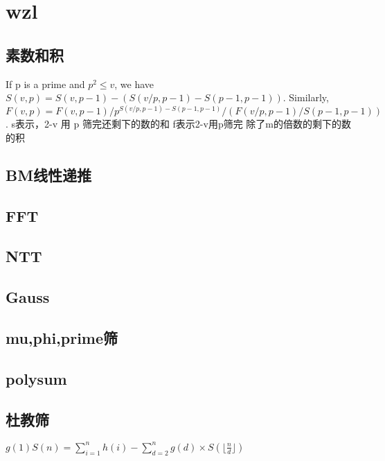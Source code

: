 \newpage
\section{wzl}
	\subsection{素数和积}
		\begin{flushleft}
			If p is a prime and $p^2 \leq v$, we have $S(v,p) = S(v,p-1) - (S(v/p,p-1) - S(p-1,p-1))$.
			\linebreak Similarly, $F(v,p) = F(v,p-1) / p^{S(v/p,p-1)-S(p-1,p-1)} / (F(v/p,p-1) / S(p-1,p-1))$.
			\linebreak s表示，2-v 用 p 筛完还剩下的数的和
			\linebreak f表示2-v用p筛完 除了m的倍数的剩下的数的积
		\end{flushleft}
		
	\subsection{BM线性递推}
		
	\subsection{FFT}
		
	\subsection{NTT}
		
	\subsection{Gauss}
		
	\subsection{mu,phi,prime筛}
		
	\subsection{polysum}
		
	\subsection{杜教筛}
		\begin{flushleft}
			$g(1)S(n) = \sum_{i = 1}^{n}h(i) - \sum_{d = 2}^{n}g(d) \times S(\lfloor\frac{n}{d}\rfloor) $
		\end{flushleft}
		
